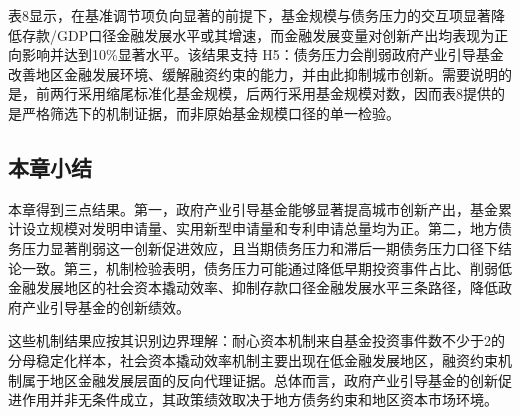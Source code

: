 表8显示，在基准调节项负向显著的前提下，基金规模与债务压力的交互项显著降低存款/GDP口径金融发展水平或其增速，而金融发展变量对创新产出均表现为正向影响并达到10\%显著水平。该结果支持 H5：债务压力会削弱政府产业引导基金改善地区金融发展环境、缓解融资约束的能力，并由此抑制城市创新。需要说明的是，前两行采用缩尾标准化基金规模，后两行采用基金规模对数，因而表8提供的是严格筛选下的机制证据，而非原始基金规模口径的单一检验。

\subsection{本章小结}

本章得到三点结果。第一，政府产业引导基金能够显著提高城市创新产出，基金累计设立规模对发明申请量、实用新型申请量和专利申请总量均为正。第二，地方债务压力显著削弱这一创新促进效应，且当期债务压力和滞后一期债务压力口径下结论一致。第三，机制检验表明，债务压力可能通过降低早期投资事件占比、削弱低金融发展地区的社会资本撬动效率、抑制存款口径金融发展水平三条路径，降低政府产业引导基金的创新绩效。

这些机制结果应按其识别边界理解：耐心资本机制来自基金投资事件数不少于2的分母稳定化样本，社会资本撬动效率机制主要出现在低金融发展地区，融资约束机制属于地区金融发展层面的反向代理证据。总体而言，政府产业引导基金的创新促进作用并非无条件成立，其政策绩效取决于地方债务约束和地区资本市场环境。
